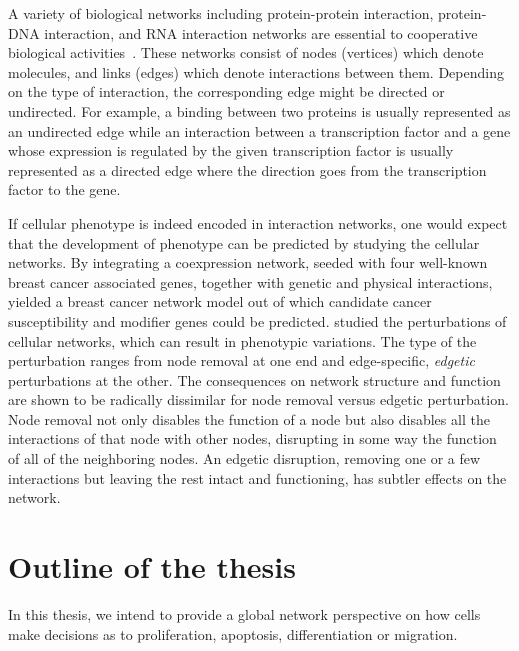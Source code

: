 
A variety of biological networks including protein-protein interaction, protein-DNA interaction, and RNA interaction networks are essential to cooperative biological activities~\citep{Zhu2007a}. These networks consist of nodes (vertices) which denote molecules, and links (edges) which denote interactions between them. Depending on the type of interaction, the corresponding edge might be directed or undirected. For example, a binding between two proteins is usually represented as an undirected edge while an interaction between a transcription factor and a gene whose expression is regulated by the given transcription factor is usually represented as a directed edge where the direction goes from the transcription factor to the gene.

If cellular phenotype is indeed encoded in interaction 
networks, one would expect that the development of 
phenotype can be predicted by studying the cellular
networks. By integrating a coexpression network, seeded with four well-known breast cancer
associated genes, together with genetic and physical interactions, \cite{Pujana2007} yielded a breast cancer network model out of which candidate cancer susceptibility and modifier genes could be predicted.
\cite{Zhong2009} studied the
perturbations of cellular networks, which can result in phenotypic variations.
The type of the perturbation ranges from node removal at one end and edge-specific,
\emph{edgetic} perturbations at the other. The
consequences on network structure and function are shown
to be radically dissimilar for node removal versus edgetic perturbation. Node removal not only disables the function of a node but
also disables all the interactions of that node with other nodes,
disrupting in some way the function of all of the neighboring nodes. An edgetic disruption, removing one or a few interactions
but leaving the rest intact and functioning, has subtler effects
on the network. 

\section{Outline of the thesis}
In this thesis, we intend to provide a global network
perspective on how cells make decisions as to proliferation,
apoptosis, differentiation or migration.

